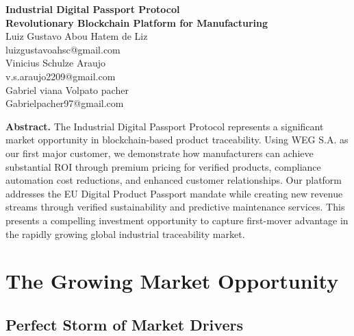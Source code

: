 \documentclass[11pt,a4paper]{article}
\begin{document}
\begin{center}
\textbf{\Large Industrial Digital Passport Protocol}\\
\textbf{\large Revolutionary Blockchain Platform for Manufacturing}\\
\vspace{0.5cm}
Luiz Gustavo Abou Hatem de Liz\\
luizgustavoahsc@gmail.com\\
\vspace{0.3cm}
Vinicius Schulze Araujo\\
v.s.araujo2209@gmail.com\\
\vspace{0.3cm}
Gabriel viana Volpato pacher\\
Gabrielpacher97@gmail.com\\
\end{center}

\vspace{1cm}

\textbf{Abstract.} The Industrial Digital Passport Protocol represents a significant market opportunity in blockchain-based product traceability. Using WEG S.A. as our first major customer, we demonstrate how manufacturers can achieve substantial ROI through premium pricing for verified products, compliance automation cost reductions, and enhanced customer relationships. Our platform addresses the EU Digital Product Passport mandate while creating new revenue streams through verified sustainability and predictive maintenance services. This presents a compelling investment opportunity to capture first-mover advantage in the rapidly growing global industrial traceability market.

\section{The Growing Market Opportunity}

\subsection{Perfect Storm of Market Drivers}
\end{document}
